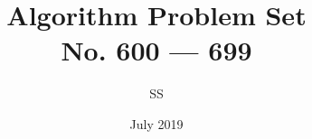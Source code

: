 \documentclass[a4paper,12pt]{article}
\title{Algorithm Problem Set \\ \large No. 600 --- 699}
\author{SS}
\date{July 2019}
\begin{document}
\renewcommand{\thelstlisting}{\thesection.\arabic{lstlisting}}
\newcommand{\fcc}[1]{\lstinline[language=C++, basicstyle=\small\ttfamily, keywordstyle=\bfseries\color{green!40!black}]|#1|}
\newcommand{\fcj}[1]{\lstinline[language=Java, basicstyle=\small\ttfamily, keywordstyle=\bfseries\color{green!40!black}]|#1|}
\maketitle
% 
% 
% 
% 
% 
% 
% 
% 
% 
% 
% 

%
%
%
%
% 
% 
%
%
%
% 
% 
% 
% 
% 
%
%
% 
% 
% 
% 
% 
% 
% 
% 
% 
% 
% 
% 
% 
% 
% 
% 
% 
% 
% 
% 
% 
% 
% 
% 
% 
% 
% 
% 
% 
% 
% 
% 
% 
% 
% 
% 
% 
% 
% 
% 
% 
% 
% 
% 
% 
% 
% 
% 
% 
% 
% 
% 
% 



















\end{document}
